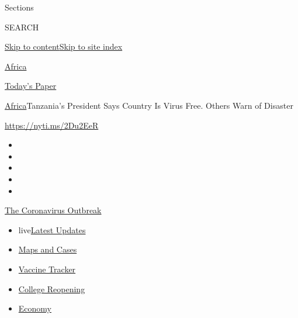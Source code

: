 Sections

SEARCH

\protect\hyperlink{site-content}{Skip to
content}\protect\hyperlink{site-index}{Skip to site index}

\href{https://www.nytimes3xbfgragh.onion/section/world/africa}{Africa}

\href{https://myaccount.nytimes3xbfgragh.onion/auth/login?response_type=cookie\&client_id=vi}{}

\href{https://www.nytimes3xbfgragh.onion/section/todayspaper}{Today's
Paper}

\href{/section/world/africa}{Africa}\textbar{}Tanzania's President Says
Country Is Virus Free. Others Warn of Disaster

\url{https://nyti.ms/2Du2EeR}

\begin{itemize}
\item
\item
\item
\item
\item
\end{itemize}

\href{https://www.nytimes3xbfgragh.onion/news-event/coronavirus?action=click\&pgtype=Article\&state=default\&region=TOP_BANNER\&context=storylines_menu}{The
Coronavirus Outbreak}

\begin{itemize}
\tightlist
\item
  live\href{https://www.nytimes3xbfgragh.onion/2020/08/04/world/coronavirus-cases.html?action=click\&pgtype=Article\&state=default\&region=TOP_BANNER\&context=storylines_menu}{Latest
  Updates}
\item
  \href{https://www.nytimes3xbfgragh.onion/interactive/2020/us/coronavirus-us-cases.html?action=click\&pgtype=Article\&state=default\&region=TOP_BANNER\&context=storylines_menu}{Maps
  and Cases}
\item
  \href{https://www.nytimes3xbfgragh.onion/interactive/2020/science/coronavirus-vaccine-tracker.html?action=click\&pgtype=Article\&state=default\&region=TOP_BANNER\&context=storylines_menu}{Vaccine
  Tracker}
\item
  \href{https://www.nytimes3xbfgragh.onion/2020/08/02/us/covid-college-reopening.html?action=click\&pgtype=Article\&state=default\&region=TOP_BANNER\&context=storylines_menu}{College
  Reopening}
\item
  \href{https://www.nytimes3xbfgragh.onion/live/2020/08/04/business/stock-market-today-coronavirus?action=click\&pgtype=Article\&state=default\&region=TOP_BANNER\&context=storylines_menu}{Economy}
\end{itemize}

